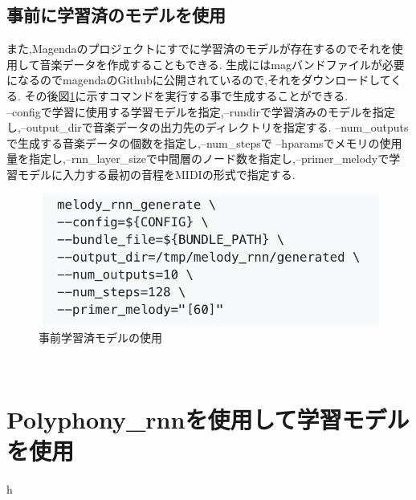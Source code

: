 \subsection{事前に学習済のモデルを使用}
また,Magendaのプロジェクトにすでに学習済のモデルが存在するのでそれを使用して音楽データを作成することもできる.
生成にはmagバンドファイルが必要になるのでmagendaのGithubに公開されているので,それをダウンロードしてくる.
その後図\ref{img:事前学習済モデルの使用}に示すコマンドを実行する事で生成することができる.\\
--configで学習に使用する学習モデルを指定,--rundirで学習済みのモデルを指定し,--output\_dirで音楽データの出力先のディレクトリを指定する.
--num\_outputsで生成する音楽データの個数を指定し,--num\_stepsで
--hparamsでメモリの使用量を指定し,--rnn\_layer\_sizeで中間層のノード数を指定し,--primer\_melodyで学習モデルに入力する最初の音程をMIDIの形式で指定する.\\
\begin{figure}[!ht]
    \begin{screen}
    \begin{center}
        \includegraphics[scale=1.1, clip]{./img/Use_preliminarymodel.png}
        \caption{事前学習済モデルの使用}
        \label{img:事前学習済モデルの使用}
    \end{center}
    \end{screen}
\end{figure}\\
\section{Polyphony\_rnnを使用して学習モデルを使用}
h
